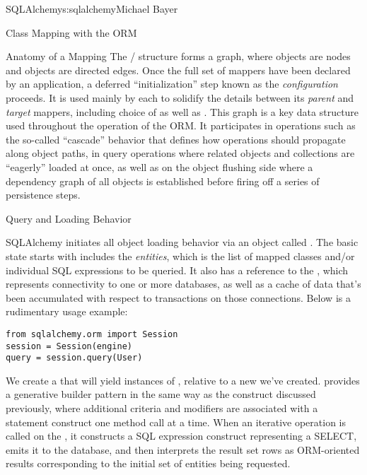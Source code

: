 \begin{aosachapter}{SQLAlchemy}{s:sqlalchemy}{Michael Bayer}
\begin{aosasect1}{Class Mapping with the ORM}
\begin{aosasect2}{Anatomy of a Mapping}
The / structure forms a graph, where  objects are nodes and
 objects are directed edges. Once the full set of
mappers have been declared by an application, a deferred ``initialization'' step
known as the \emph{configuration} proceeds. It is used mainly by each
 to solidify the details between its \emph{parent} and
\emph{target} mappers, including choice of  as well as .
This graph is a key data structure used
throughout the operation of the ORM.  It participates in operations such as the
so-called ``cascade'' behavior that defines how operations should propagate
along object paths, in query operations where related objects and collections
are ``eagerly'' loaded at once, as well as on the object flushing side where a
dependency graph of all objects is established before firing off a series of
persistence steps.

\end{aosasect2}

\end{aosasect1}

\begin{aosasect1}{Query and Loading Behavior}

SQLAlchemy initiates all object loading behavior via an object called .   The basic
state  starts with includes the \emph{entities}, which is the list of mapped classes
and/or individual SQL expressions to be queried.   It also has a reference to the
, which represents connectivity to one or
more databases, as well as a cache of data that's been accumulated with respect to
transactions on those connections.   Below is a rudimentary usage example:

\begin{verbatim}
from sqlalchemy.orm import Session
session = Session(engine)
query = session.query(User)
\end{verbatim}

We create a  that will yield instances of , relative to a new
 we've created.   provides a generative builder pattern in the same
way as the  construct discussed previously, where additional criteria and
modifiers are associated with a statement construct one method call at a time.
When an iterative operation
is called on the , it constructs a SQL expression construct representing
a SELECT, emits it to the database, and then interprets the result set rows as
ORM-oriented results corresponding to the initial set of entities being requested.


\end{aosasect1}
\end{aosachapter}
